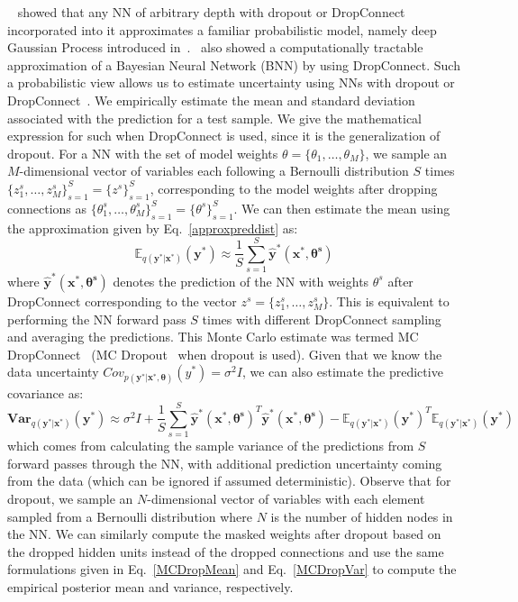     ~\cite{DropoutUQ} showed that any NN of arbitrary depth with dropout or DropConnect incorporated into it approximates a familiar probabilistic model, namely deep Gaussian Process introduced in~\cite{DeepGP}.~\cite{DropConnectUQ} also showed a computationally tractable approximation of
    a Bayesian Neural Network (BNN) by using DropConnect. Such a probabilistic view allows us to estimate uncertainty using NNs with dropout or DropConnect~\cite{DropoutUQ, DropConnectUQ}. We empirically estimate the mean and standard deviation associated with the prediction for a test sample. We give the mathematical expression for such when DropConnect is used, since it is the generalization of dropout. For a NN with the set of model weights $\theta = \{\theta_1, \ldots, \theta_M\}$, we sample an $M$-dimensional vector of variables each following a Bernoulli distribution $S$ times $\{z^s_1, \ldots, z^s_M\}_{s=1}^S = \{z^s\}_{s=1}^S$, corresponding to the model weights after dropping connections as $\{\theta^s_1, \ldots, \theta^s_M\}_{s=1}^S = \{\theta^s\}_{s=1}^S$. We can then estimate the mean using the approximation given by Eq.~\ref{approxpreddist} as:
    \begin{equation}\label{MCDropMean}
        \mathbb{E}_{q(\mathbf{y^*|x^*})}(\mathbf{y^*}) \approx \frac{1}{S} \sum_{s=1}^S \mathbf{\hat{y}^*(x^*,\theta^s)}
    \end{equation}
    where $\mathbf{\hat{y}^*(x^*,\theta^s)}$ denotes the prediction of the NN with weights $\theta^s$ after DropConnect corresponding to the vector $z^s=\{z^s_1, \ldots, z^s_M\}$. This is equivalent to performing the NN forward pass $S$ times with different DropConnect sampling and averaging the predictions. This Monte Carlo estimate was termed MC DropConnect~\cite{DropConnectUQ} (MC Dropout~\cite{DropoutUQ} when dropout is used). Given that we know the data uncertainty $Cov_{p(\mathbf{y^*|x^*, \theta})}(y^*) = \sigma^2I$, we can also estimate the predictive covariance as:
    \begin{equation}\label{MCDropVar}
        \mathbf{Var}_{q(\mathbf{y^*|x^*})}(\mathbf{y^*}) \approx \sigma^2I + \frac{1}{S} \sum_{s=1}^S \mathbf{\hat{y}^*(x^*,\theta^s)}^T \mathbf{\hat{y}^*(x^*,\theta^s)} - \mathbb{E}_{q(\mathbf{y^*|x^*})}(\mathbf{y^*})^T \mathbb{E}_{q(\mathbf{y^*|x^*})}(\mathbf{y^*})
    \end{equation}
    which comes from calculating the sample variance of the predictions from $S$ forward passes through the NN, with additional prediction uncertainty coming from the data (which can be ignored if assumed deterministic). Observe that for dropout, we sample an $N$-dimensional vector of variables with each element sampled from a Bernoulli distribution where $N$ is the number of hidden nodes in the NN. We can similarly compute the masked weights after dropout based on the dropped hidden units instead of the dropped connections and use the same formulations given in Eq.~\ref{MCDropMean} and Eq.~\ref{MCDropVar} to compute the empirical posterior mean and variance, respectively.
    \newline

